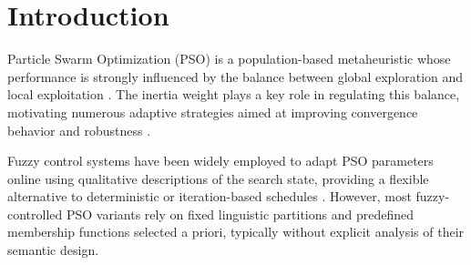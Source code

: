 \documentclass[runningheads]{llncs}
\begin{document}
%
\maketitle              %
%
\begin{abstract}
The effectiveness of fuzzy-controlled Particle Swarm Optimization (PSO) largely depends on design choices that are often treated as secondary implementation details. While fuzzy control systems are used to adapt metaheuristic parameters, the impact of linguistic granularity and membership function design is rarely analyzed explicitly. This paper presents a focused experimental study of a swarm-level fuzzy-controlled PSO, providing an initial empirical assessment of three- and five-label linguistic schemes under identical control logic driven by iteration progress and population diversity. Results on representative benchmark functions show that fuzzy control improves robustness and average performance in complex multimodal landscapes, while providing no benefit in unimodal or structurally regular problems. These findings indicate that fuzzy semantic design constitutes a relevant experimental dimension in adaptive metaheuristics and should be analyzed explicitly rather than assumed as fixed.




\end{abstract}

\section{Introduction}

Particle Swarm Optimization (PSO) is a population-based metaheuristic whose performance is strongly influenced by the balance between global exploration and local exploitation \cite{kennedy1995particle}. The inertia weight plays a key role in regulating this balance, motivating numerous adaptive strategies aimed at improving convergence behavior and robustness \cite{shi1998modified}.

Fuzzy control systems have been widely employed to adapt PSO parameters online using qualitative descriptions of the search state, providing a flexible alternative to deterministic or iteration-based schedules \cite{shi2001fuzzy}. However, most fuzzy-controlled PSO variants rely on fixed linguistic partitions and predefined membership functions selected a priori, typically without explicit analysis of their semantic design.
\end{document}
